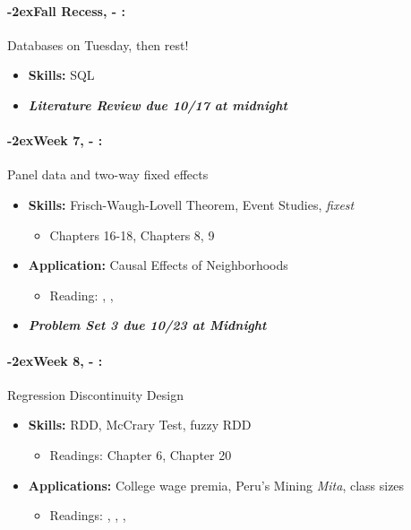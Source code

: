 \documentclass[11pt]{article}
\newcommand{\week}[1]{%
  \paragraph*{\kern-2ex\quad #1, \AdvanceDate[1]\syldate{\today} - \AdvanceDate[2]\syldate{\today}:}%
  \ifdim\wd1=\wd\MONDAY
    \AdvanceDate[7]
  \else
    \AdvanceDate[7]
  \fi%
}
\begin{document}
\week{Fall Recess} Databases on Tuesday, then rest!
\begin{itemize}
  \item \textbf{Skills:} SQL
  \item \textit{\textbf{Literature Review due 10/17 at midnight}}
\end{itemize}
\week{Week 7} Panel data and two-way fixed effects
\begin{itemize}
  \item \textbf{Skills:} Frisch-Waugh-Lovell Theorem, Event Studies, \textit{fixest}
  \begin{itemize}
    \item \cite{hungtintonklein2023effect} Chapters 16-18, \cite{cunningham2023mixtape} Chapters 8, 9
  \end{itemize}
  \item \textbf{Application:} Causal Effects of Neighborhoods
  \begin{itemize}
    \item Reading: \textbf{\cite{chetty2018neighborhoods}}, \textbf{\cite{chetty2019moving}}, \textbf{\cite{chetty2016moving}}
  \end{itemize}
  \item \textit{\textbf{Problem Set 3 due 10/23 at Midnight}}
\end{itemize}
\week{Week 8} Regression Discontinuity Design
\begin{itemize}
  \item \textbf{Skills:} RDD, McCrary Test, fuzzy RDD
  \begin{itemize}
    \item Readings: \cite{cunningham2023mixtape} Chapter 6, \cite{hungtintonklein2023effect} Chapter 20
  \end{itemize}
  \item \textbf{Applications:} College wage premia, Peru's Mining \textit{Mita}, class sizes
  \begin{itemize}
    \item Readings: \textbf{\cite{dell2010mita}}, \textbf{\cite{zimmerman2014returns}}, \textbf{\cite{angrist1999maimonides}}, \cite{chetty2023diversifying}
  \end{itemize}
\end{itemize}
\end{document}
